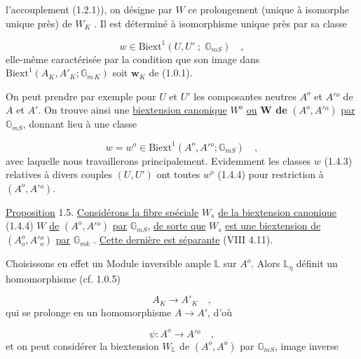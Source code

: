 
l'accouplement (1.2.1)), on désigne par $W$ ce prolongement (unique à isomorphe unique près) de $W_K$ . Il est déterminé à isomorphisme unique près par sa classe

\begin{equation}\tag{1.4.3}
w \in \mathrm{Biext}^1(U,U' \; ; \; \mathbb{G}_{mS}) \quad ,
\end{equation}
elle-même caractérisée par la condition que son image dans $\mathrm{Biext}^1(A_K,A'_K;\mathbb{G}_{m\,K})$ soit $\mathbf{w}_K$ de (1.0.1).

On peut prendre par exemple pour $U$ et $U'$ les composantes neutres $A^o$ et $A'{}^o$ de $A$ et $A'$. On trouve ainsi une \underline{biextension canonique} $W^o$ \underline{ou} \textbf{W de} $(A^o,A'{}^o)$ \underline{par} $\mathbb{G}_{mS}$, donnant lieu à une classe

\begin{equation}\tag{1.4.4}
w = w^o \in \mathrm{Biext}^1(A^o,A'{}^o;\mathbb{G}_{mS}) \quad ,
\end{equation}
avec laquelle nous travaillerons principalement. Evidemment les classes $w$ (1.4.3) relatives à divers couples $(U,U')$ ont toutes $w^o$ (1.4.4) pour restriction à $(A^o,A'{}^o)$.

\underline{Proposition} 1.5. \underline{Considérons la fibre spéciale} $W_s$ \underline{de la biextension canonique} (1.4.4) $W$ \underline{de} $(A^o,A'{}^o)$ \underline{par} $\mathbb{G}_{mS}$, \underline{de sorte que} $W_s$ \underline{est une biextension de} $(A^o_o,A'{}^o_o)$ \underline{par} $\mathbb{G}_{mk}$ . \underline{Cette dernière est séparante} (VIII 4.11).

Choisissons en effet un Module inversible ample $\mathbb{L}$ sur $A^o$. Alors $\mathbb{L}_\eta$ définit un homomorphisme (cf. 1.0.5)

\begin{equation*}
A_K \longrightarrow A'_K \quad ,
\end{equation*}
qui se prolonge en un homomorphisme $A \longrightarrow A'$, d'où

\begin{equation*}
\psi : A^o \longrightarrow A'{}^o \quad ,
\end{equation*}
et on peut considérer la biextension $W_{\mathbb{L}}$ de $(A^o,A^o)$ par $\mathbb{G}_{mS}$, image inverse



